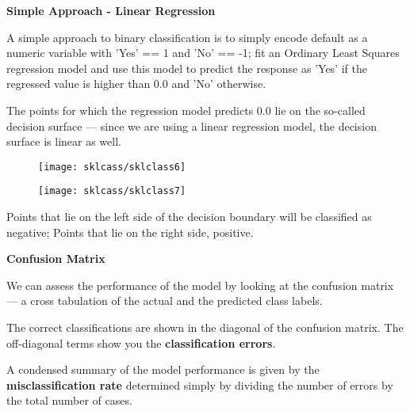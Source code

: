 \documentclass[MASTER.tex]{subfiles}
\begin{document}
 
 
  
\textbf{Simple Approach - Linear Regression}
 
\item A simple approach to binary classification is to simply encode default as a numeric variable with 'Yes' == 1 and 'No' == -1; fit an Ordinary Least Squares regression model and use this model to predict the response as 'Yes' if the regressed value is higher than 0.0 and 'No' otherwise. 
\item The points for which the regression model predicts 0.0 lie on the so-called decision surface — since we are using a linear regression model, the decision surface is linear as well.
 

 

% 
% 
 
\begin{figure}
\centering
\texttt{[image: sklcass/sklclass6]}
\end{figure}

 
 
\begin{figure}
\centering
\texttt{[image: sklcass/sklclass7]}

\end{figure}

 
 
  
  Points that lie on the left side of the decision boundary will be classified as negative; 
  Points that lie on the right side, positive. 
  

 

 
  
\textbf{Confusion Matrix}
 
\item We can assess the performance of the model by looking at the confusion matrix — a cross tabulation of the actual and the predicted class labels. 

\item The correct classifications are shown in the diagonal of the confusion matrix. The off-diagonal terms show you the \textbf{classification errors}. 
\item A condensed summary of the model performance is given by the \textbf{misclassification rate} determined simply by dividing the number of errors by the total number of cases.
 
\end{document}

